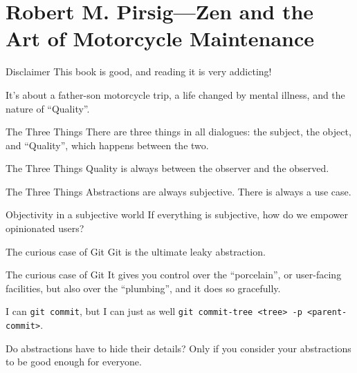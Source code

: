 \documentclass[aspectratio=169]{beamer}
\begin{document}
  \section{Robert M. Pirsig—Zen and the Art of Motorcycle Maintenance}
  \begin{frame}{Disclaimer}
    This book is good, and reading it is very addicting!

    It’s about a father-son motorcycle trip, a life changed by mental illness,
    and the nature of “Quality”.
  \end{frame}
  \begin{frame}{The Three Things}
    There are three things in all dialogues: the subject, the object, and
    “Quality”, which happens between the two.
  \end{frame}
  \begin{frame}{The Three Things}
    Quality is always between the observer and the observed.
  \end{frame}
  \begin{frame}{The Three Things}
    Abstractions are always subjective. There is always a use case.
  \end{frame}
  \begin{frame}{Objectivity in a subjective world}
    If everything is subjective, how do we empower opinionated users?
  \end{frame}
  \begin{frame}{The curious case of Git}
    Git is the ultimate leaky abstraction.
  \end{frame}
  \begin{frame}{The curious case of Git}
    It gives you control over the “porcelain”, or user-facing facilities, but
    also over the “plumbing”, and it does so gracefully.

    \small{%
      I can \texttt{git commit}, but I can just as well \texttt{git commit-tree
      <tree> -p <parent-commit>}.
    }
  \end{frame}
  \begin{frame}{Do abstractions have to hide their details?}
    Only if you consider your abstractions to be good enough for everyone.
  \end{frame}
\end{document}

